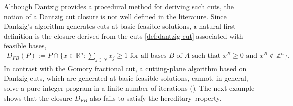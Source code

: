 \documentclass{article}
\newtheorem{prop}{Proposition}
\newcommand{\Z}{\mathbb{Z}}
\newcommand{\R}{\mathbb{R}}
\begin{document}
Although Dantzig provides a procedural method for deriving such cuts, the notion of a Dantzig cut closure is not well defined in the literature. Since Dantzig's algorithm generates cuts at basic feasible solutions, a natural first definition is the closure derived from the cuts \eqref{def:dantzig-cut} associated with feasible bases,
\begin{align}
    D_{FB}(P) := P \cap \Big\{x \in \R^n: \sum_{j \in N} x_j \geq 1 \text{ for all bases } B \text{ of } A \text{ such that } x^{B} \geq 0 \text{ and } x^{B} \notin \Z^n \Big\}. \label{eq:dantzig-feasible-closure}
\end{align}
In contrast with the Gomory fractional cut, a cutting-plane algorithm based on Dantzig cuts, which are generated at basic feasible solutions, cannot, in general, solve a pure integer program in a finite number of iterations (\cite{gomory1963convergence}). The next example shows that the closure $D_{FB}$ also fails to satisfy the hereditary property.



\end{document}
